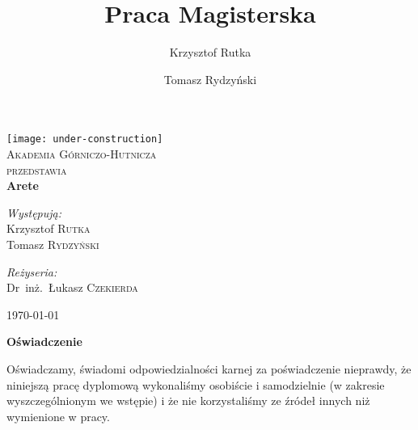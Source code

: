 \documentclass[a4paper,oneside,12pt]{mwbk}
\title{Praca Magisterska}
\author{Krzysztof Rutka \and Tomasz Rydzyński}
\begin{document}
\frontmatter

\begin{titlepage}

\begin{center}

\texttt{[image: under-construction]}\\[1cm]    

\textsc{\LARGE Akademia Górniczo-Hutnicza}\\[1.5cm]

\textsc{\Large przedstawia}\\[0.5cm]


{ \huge \bfseries Arete}\\[0.4cm]


\begin{minipage}{0.4\textwidth}
\begin{flushleft} \large
\emph{Występują:}\\
Krzysztof \textsc{Rutka} \\
Tomasz \textsc{Rydzyński} \\
\end{flushleft}
\end{minipage}
\begin{minipage}{0.4\textwidth}
\begin{flushright} \large
\emph{Reżyseria:} \\
Dr~inż.~Łukasz \textsc{Czekierda}
\end{flushright}
\end{minipage}

\vfill

{\large \today}

\end{center}

\end{titlepage}

\clearpage
\pagestyle{empty}
{\textbf{\Large{Oświadczenie}}}

Oświadczamy, świadomi odpowiedzialności karnej za poświadczenie nieprawdy, że
niniejszą pracę dyplomową wykonaliśmy osobiście i samodzielnie (w zakresie
wyszczególnionym we wstępie) i że nie korzystaliśmy ze źródeł innych niż
wymienione w pracy.
\clearpage

\setcounter{tocdepth}{1}



\begin{spacing}{0.9}
\tableofcontents
\end{spacing}

\mainmatter








\appendix



\backmatter

\end{document}

